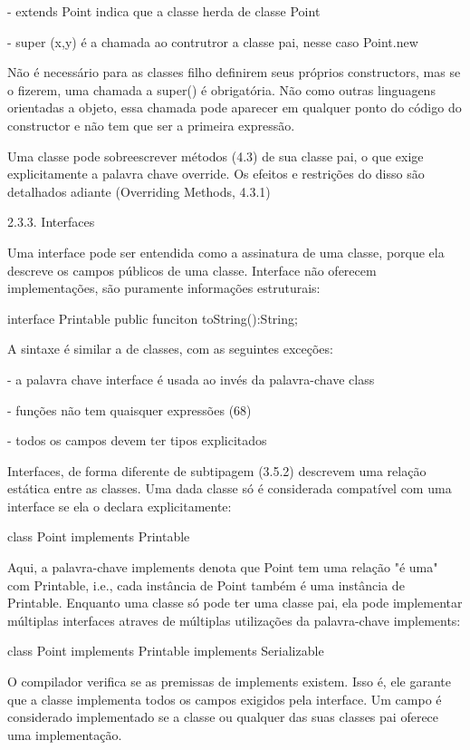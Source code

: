 {- extends Point indica que a classe herda de classe Point

- super (x,y) é a chamada ao contrutror a classe pai, nesse caso Point.new

Não é necessário para as classes filho definirem seus próprios constructors, mas se o fizerem, uma chamada a super() é obrigatória. Não como outras linguagens orientadas a objeto, essa chamada pode aparecer em qualquer ponto do código do constructor e não tem que ser a primeira expressão.

Uma classe pode sobreescrever métodos (4.3) de sua classe pai, o que exige explicitamente a palavra chave override. Os efeitos e restrições do disso são detalhados adiante (Overriding Methods, 4.3.1)

2.3.3. Interfaces

Uma interface pode ser entendida como a assinatura de uma classe, porque ela descreve os campos públicos de uma classe. Interface não oferecem implementações, são puramente informações estruturais:

interface Printable {
    public funciton toString():String;
}

A sintaxe é similar a de classes, com as seguintes exceções:

- a palavra chave interface é usada ao invés da palavra-chave class

- funções não tem quaisquer expressões (68)

- todos os campos devem ter tipos explicitados

Interfaces, de forma diferente de subtipagem (3.5.2) descrevem uma relação estática entre as classes. Uma dada classe só é considerada compatível com uma interface se ela o declara explicitamente:

class Point implements Printable { }

Aqui, a palavra-chave implements denota que Point tem uma relação "é uma" com Printable, i.e., cada instância de Point também é uma instância de Printable. Enquanto uma classe só pode ter uma classe pai, ela pode implementar múltiplas interfaces atraves de múltiplas utilizações da palavra-chave implements:

class Point implements Printable
    implements Serializable

O compilador verifica se as premissas de implements existem. Isso é, ele garante que a classe implementa todos  os campos exigidos pela interface. Um campo é considerado implementado se a classe ou qualquer das suas classes pai oferece uma implementação.

}
